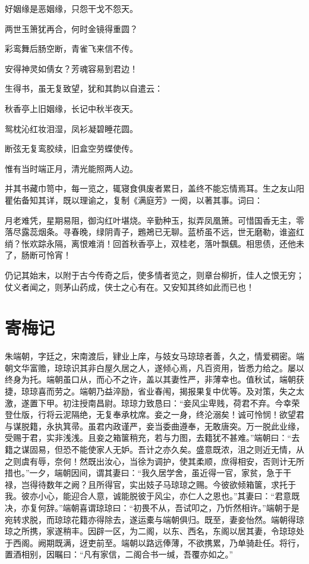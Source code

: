 \documentclass[a4paper,12pt,UTF8,twoside]{ctexbook}
\begin{document}
好姻缘是恶姻缘，只怨干戈不怨天。

两世玉箫犹再合，何时金镜得重圆？

彩鸾舞后肠空断，青雀飞来信不传。

安得神灵如倩女？芳魂容易到君边！

生得书，虽无复致望，犹和其韵以自遣云：

秋香亭上旧姻缘，长记中秋半夜天。

鸳枕沁红妆泪湿，凤衫凝碧睡花圆。

断弦无复鸾胶续，旧盒空劳蝶使传。

惟有当时端正月，清光能照两人边。

并其书藏巾笥中，每一览之，辄寝食俱废者累日，盖终不能忘情焉耳。生之友山阳瞿佑备知其详，既以理谕之，复制《满庭芳》一阕，以著其事。词曰：

月老难凭，星期易阻，御沟红叶堪烧。辛勤种玉，拟弄凤凰箫。可惜国香无主，零落尽露蕊烟条。寻春晚，绿阴青子，鶗鴂已无聊。蓝桥虽不远，世无磨勒，谁盗红绡？怅欢踪永隔，离恨难消！回首秋香亭上，双桂老，落叶飘颻。相思债，还他未了，肠断可怜宵！

仍记其始末，以附于古今传奇之后，使多情者览之，则章台柳折，佳人之恨无穷；仗义者闻之，则茅山药成，侠士之心有在。又安知其终如此而已也！

\chapter{寄梅记}

朱端朝，字廷之，宋南渡后，肄业上庠，与妓女马琼琼者善，久之，情爱稠密。端朝文华富赡，琼琼识其非白屋久居之人，遂倾心焉，凡百资用，皆悉力给之。屡以终身为托。端朝虽口从，而心不之许，盖以其妻性严，非薄幸也。值秋试，端朝获捷，琼琼喜而劳之。端朝乃益淬励，省业春闱，揭报果复中优等。及对策，失之太激，遂置下甲。初注授南昌尉。琼琼力致恳曰：“妾风尘卑贱，荷君不弃。今幸荣登仕版，行将云泥隔绝，无复奉承枕席。妾之一身，终沦溺矣！诚可怜悯！欲望君与谋脱籍，永执箕帚。虽君内政谨严，妾当委曲遵奉，无敢唐突。万一脱此业缘，受赐于君，实非浅浅。且妾之箱箧稍充，若与力图，去籍犹不甚难。”端朝曰：“去籍之谋固易，但恐不能使家人无妒。吾计之亦久矣。盛意既浓，沮之则近无情，从之则虞有辱，奈何！然既出汝心，当徐为调护，使其柔顺，庶得相安，否则计无所措也。”一夕，端朝因间，谓其妻曰：“我久居学舍，虽近得一官，家贫，急于干禄，岂得待数年之阙？且所得官，实出妓子马琼琼之赐。今彼欲倾箱箧，求托于我。彼亦小心，能迎合人意，诚能脱彼于风尘，亦仁人之恩也。”其妻曰：“君意既决，亦复何辞。”端朝喜谓琼琼曰：“初畏不从，吾试叩之，乃忻然相许。”端朝于是宛转求脱，而琼琼花籍亦得除去，遂运橐与端朝俱归。既至，妻妾怡然。端朝得琼琼之所携，家遂稍丰。因辟一区，为二阁，以东、西名，东阁以居其妻，令琼琼处于西阁。阙期既满，迓吏前至。端朝以路远俸薄，不欲携累，乃单骑赴任。将行，置酒相别，因瞩曰：“凡有家信，二阁合书一缄，吾覆亦如之。”
\end{document}
